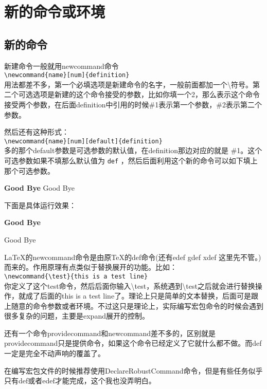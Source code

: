 \documentclass[11pt,oneside]{book}
\begin{document}
      \chapter{新的命令或环境}
      \section{新的命令}
      新建命令一般就用newcommand命令\\
      \verb+\newcommand{name}[num]{definition}+\\
      用法都差不多，第一个必填选项是新建命令的名字，一般前面都加一个\textbackslash 符号。第二个可选选项是新建的这个命令接受的参数，比如你填一个2，那么表示这个命令接受两个参数，在后面definition中引用的时候\#{}1表示第一个参数，\#{}2表示第二个参数。

      然后还有这种形式：\\
      \verb+\newcommand{name}[num][default]{definition}+\\
      多的那个default参数是可选参数的默认值，在definition那边对应的就是 \#{}1。这个可选参数如果不填那么默认值为 \verb+def+ ，然后后面利用这个新的命令可以如下填上那个可选参数。

      \begin{tcbcode}[tex]
        \newcommand\GoodBye[1][\bfseries]{{#1 Good Bye}}

        \GoodBye
        \GoodBye[\color{red}]
      \end{tcbcode}

      下面是具体运行效果：
      \newcommand\GoodBye[1][\bfseries]{{#1 Good Bye}}

      \GoodBye

      \GoodBye[\color{red}]

      \LaTeX 的newcommand命令是由原\TeX 的def命令(还有edef gdef xdef 这里先不管。)而来的。作用原理有点类似于替换展开的功能。比如：\\
      \verb+\newcommand{\test}{this is a test line}+\\
      你定义了这个test命令，然后后面你输入\textbackslash test，系统遇到\textbackslash test之后就会进行替换操作，就成了后面的this is a test line了。理论上只是简单的文本替换，后面可是跟上随意的命令参数或者环境。不过这只是理论上，实际编写宏包命令的时候会遇到很多复杂的问题，主要是expand展开的控制。

      还有一个命令providecommand和newcommand差不多的，区别就是providecommand只是提供命令，如果这个命令已经定义了它就什么都不做。而def一定是完全不动声响的覆盖了。

      在编写宏包文件的时候推荐使用DeclareRobustCommand命令，但是有些任务似乎只有def或者edef才能完成，这个我也没弄明白。
\end{document}
